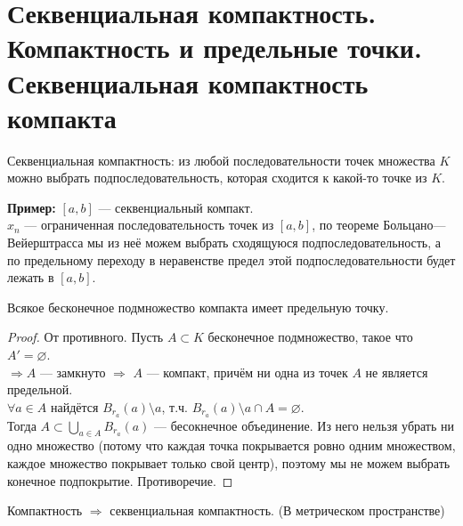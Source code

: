 \section{Секвенциальная компактность. Компактность и предельные точки. Секвенциальная компактность компакта}

\begin{conj}
    Секвенциальная компактность: из любой последовательности точек множества
    $K$ можно выбрать подпоследовательность, которая сходится к какой-то точке из $K$.
\end{conj}

\textbf{Пример:}
    $[a,b]$ --- секвенциальный компакт. \\
    $x_n$ --- ограниченная последовательность точек из $[a,b]$, по теореме
    Больцано—Вейерштрасса мы из неё можем выбрать сходящуюся подпоследовательность, а
    по предельному переходу в неравенстве предел этой подпоследовательности будет лежать в $[a,b]$.
    
\begin{theorem-non}
    Всякое бесконечное подмножество компакта имеет предельную точку.

    \begin{proof}
        От противного. Пусть $A \subset K$ бесконечное подмножество, такое что $A' = \varnothing$. \\
        $\Longrightarrow A$ --- замкнуто $\Longrightarrow$ $A$ --- компакт, причём ни одна из точек $A$ не является предельной. \\
        $\forall a \in A$ найдётся $B_{r_a}(a) \setminus a$, т.ч. $B_{r_a}(a) \setminus a \cap A = \varnothing$. \\
        Тогда $A \subset \bigcup\limits_{a\in A} B_{r_a}(a)$ --- бесокнечное объединение.
        Из него нельзя убрать ни одно множество (потому что каждая точка покрывается ровно одним множеством, каждое множество покрывает только свой центр), поэтому мы не можем выбрать конечное подпокрытие. Противоречие.
    \end{proof}

\end{theorem-non}
    
\follow Компактность $\Longrightarrow$ секвенциальная компактность. (В метрическом пространстве)

